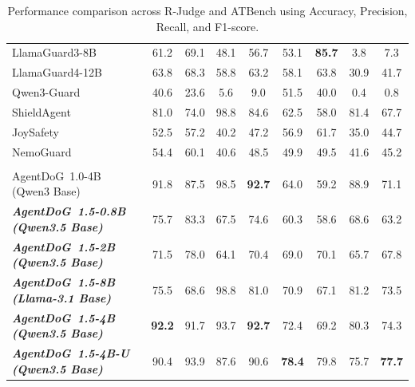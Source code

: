 \documentclass{llmxive}
\providecommand{\scoreBest}[1]{\cellcolor{green!35}\textbf{#1}}
\providecommand{\scoreHigh}[1]{\cellcolor{green!20}#1}
\providecommand{\toolAG}{{\agentdog{}}\xspace}
\providecommand{\agentdog}{AgentDoG~1.5\xspace}
\begin{document}
\begin{table}[t]
{\begin{tabular}{@{}l cccc | cccc}
\midrule
\rowcolor{AgentDoGColor!50}
\multicolumn{1}{@{}l}{\textbf{Guard Models}}         & & & & & & & & \\
\midrule
LlamaGuard3-8B & 61.2 & 69.1 & 48.1 & 56.7 & 53.1 & \scoreBest{85.7} & 3.8 & 7.3 \\
LlamaGuard4-12B & 63.8 & 68.3 & 58.8 & 63.2 & 58.1 & 63.8 & 30.9 & 41.7 \\
Qwen3-Guard & 40.6 & 23.6 & 5.6 & 9.0 & 51.5 & 40.0 & 0.4 & 0.8 \\
ShieldAgent & 81.0 & 74.0 & \scoreHigh{98.8} & 84.6 & 62.5 & 58.0 & \scoreHigh{81.4} & 67.7 \\
JoySafety & 52.5 & 57.2 & 40.2 & 47.2 & 56.9 & 61.7 & 35.0 & 44.7 \\
NemoGuard & 54.4 & 60.1 & 40.6 & 48.5 & 49.9 & 49.5 & 41.6 & 45.2 \\

\midrule
\rowcolor{AgentDoGColor!50}
\multicolumn{1}{@{}l}{\textbf{Our Models}}           & & & & & & & & \\
\midrule
AgentDoG~1.0-4B (Qwen3 Base) & \scoreHigh{91.8} & 87.5 & \scoreHigh{98.5} & \scoreBest{92.7} & 64.0 & 59.2 & \scoreHigh{88.9} & 71.1 \\
\textbf{\textit{\toolAG{}-0.8B (Qwen3.5 Base)}} & 75.7 & 83.3 & 67.5 & 74.6 & 60.3 & 58.6 & 68.6 & 63.2 \\
\textbf{\textit{\toolAG{}-2B (Qwen3.5 Base)}} & 71.5 & 78.0 & 64.1 & 70.4 & 69.0 & 70.1 & 65.7 & 67.8 \\
\textbf{\textit{\toolAG{}-8B (Llama-3.1 Base)}} & 75.5 & 68.6 & \scoreHigh{98.8} & 81.0 & \scoreHigh{70.9} & 67.1 & 81.2 & \scoreHigh{73.5} \\
\textbf{\textit{\toolAG{}-4B (Qwen3.5 Base)}} & \scoreBest{92.2} & \scoreHigh{91.7} & 93.7 & \scoreBest{92.7} & \scoreHigh{72.4} & 69.2 & 80.3 & \scoreHigh{74.3} \\
\textbf{\textit{\toolAG{}-4B-U (Qwen3.5 Base)}} & \scoreHigh{90.4} & \scoreHigh{93.9} & 87.6 & \scoreHigh{90.6} & \scoreBest{78.4} & \scoreHigh{79.8} & 75.7 & \scoreBest{77.7} \\

\bottomrule
\end{tabular}}
\vspace{-12pt}
\label{tab:main_results}
\caption{Performance comparison across R-Judge and ATBench using Accuracy, Precision, Recall, and F1-score.}
\end{table}
\endgroup
\end{document}
